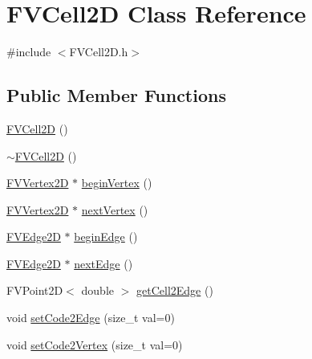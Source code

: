 \hypertarget{classFVCell2D}{
\section{FVCell2D Class Reference}
\label{da/da3/classFVCell2D}
}


{\ttfamily \#include $<$FVCell2D.h$>$}

\subsection*{Public Member Functions}
\begin{DoxyCompactItemize}
\item 
\hyperlink{classFVCell2D_ae1be13799d8d42fcb7aebe7fe88bda3f}{FVCell2D} ()
\item 
\hyperlink{classFVCell2D_abed3be74677406373585410b9e523124}{$\sim$FVCell2D} ()
\item 
\hyperlink{classFVVertex2D}{FVVertex2D} $\ast$ \hyperlink{classFVCell2D_a67415ad3823d1cd8030deaa6c4123f45}{beginVertex} ()
\item 
\hyperlink{classFVVertex2D}{FVVertex2D} $\ast$ \hyperlink{classFVCell2D_a18cc99908c3657e8afe0e7b5feee5c23}{nextVertex} ()
\item 
\hyperlink{classFVEdge2D}{FVEdge2D} $\ast$ \hyperlink{classFVCell2D_a1ae842934bc9c9c5d246f70ff2413057}{beginEdge} ()
\item 
\hyperlink{classFVEdge2D}{FVEdge2D} $\ast$ \hyperlink{classFVCell2D_a3616f047ec627e0ccc4c30343e9b24ef}{nextEdge} ()
\item 
FVPoint2D$<$ double $>$ \hyperlink{classFVCell2D_ab303dcc1c05e3294ff6cb25dcf088fe2}{getCell2Edge} ()
\item 
void \hyperlink{classFVCell2D_a9e25d24a18a62921eff34d38f8b1b896}{setCode2Edge} (size\_\-t val=0)
\item 
void \hyperlink{classFVCell2D_a0a47b3287cfccb79cba1552f3ad1e7b9}{setCode2Vertex} (size\_\-t val=0)
\end{DoxyCompactItemize}
